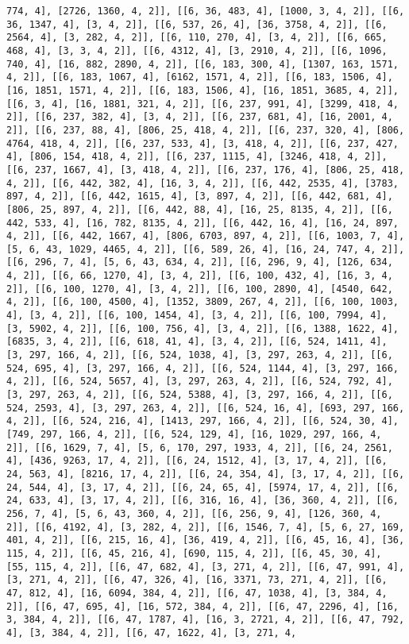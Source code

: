 \documentclass[12pt,fleqn]{article}\usepackage{../../common}
\begin{document}
\begin{verbatim}
774, 4], [2726, 1360, 4, 2]], [[6, 36, 483, 4], [1000, 3, 4, 2]], [[6, 36, 1347, 4], [3, 4, 2]], [[6, 537, 26, 4], [36, 3758, 4, 2]], [[6, 2564, 4], [3, 282, 4, 2]], [[6, 110, 270, 4], [3, 4, 2]], [[6, 665, 468, 4], [3, 3, 4, 2]], [[6, 4312, 4], [3, 2910, 4, 2]], [[6, 1096, 740, 4], [16, 882, 2890, 4, 2]], [[6, 183, 300, 4], [1307, 163, 1571, 4, 2]], [[6, 183, 1067, 4], [6162, 1571, 4, 2]], [[6, 183, 1506, 4], [16, 1851, 1571, 4, 2]], [[6, 183, 1506, 4], [16, 1851, 3685, 4, 2]], [[6, 3, 4], [16, 1881, 321, 4, 2]], [[6, 237, 991, 4], [3299, 418, 4, 2]], [[6, 237, 382, 4], [3, 4, 2]], [[6, 237, 681, 4], [16, 2001, 4, 2]], [[6, 237, 88, 4], [806, 25, 418, 4, 2]], [[6, 237, 320, 4], [806, 4764, 418, 4, 2]], [[6, 237, 533, 4], [3, 418, 4, 2]], [[6, 237, 427, 4], [806, 154, 418, 4, 2]], [[6, 237, 1115, 4], [3246, 418, 4, 2]], [[6, 237, 1667, 4], [3, 418, 4, 2]], [[6, 237, 176, 4], [806, 25, 418, 4, 2]], [[6, 442, 382, 4], [16, 3, 4, 2]], [[6, 442, 2535, 4], [3783, 897, 4, 2]], [[6, 442, 1615, 4], [3, 897, 4, 2]], [[6, 442, 681, 4], [806, 25, 897, 4, 2]], [[6, 442, 88, 4], [16, 25, 8135, 4, 2]], [[6, 442, 533, 4], [16, 782, 8135, 4, 2]], [[6, 442, 16, 4], [16, 24, 897, 4, 2]], [[6, 442, 1667, 4], [806, 6703, 897, 4, 2]], [[6, 1003, 7, 4], [5, 6, 43, 1029, 4465, 4, 2]], [[6, 589, 26, 4], [16, 24, 747, 4, 2]], [[6, 296, 7, 4], [5, 6, 43, 634, 4, 2]], [[6, 296, 9, 4], [126, 634, 4, 2]], [[6, 66, 1270, 4], [3, 4, 2]], [[6, 100, 432, 4], [16, 3, 4, 2]], [[6, 100, 1270, 4], [3, 4, 2]], [[6, 100, 2890, 4], [4540, 642, 4, 2]], [[6, 100, 4500, 4], [1352, 3809, 267, 4, 2]], [[6, 100, 1003, 4], [3, 4, 2]], [[6, 100, 1454, 4], [3, 4, 2]], [[6, 100, 7994, 4], [3, 5902, 4, 2]], [[6, 100, 756, 4], [3, 4, 2]], [[6, 1388, 1622, 4], [6835, 3, 4, 2]], [[6, 618, 41, 4], [3, 4, 2]], [[6, 524, 1411, 4], [3, 297, 166, 4, 2]], [[6, 524, 1038, 4], [3, 297, 263, 4, 2]], [[6, 524, 695, 4], [3, 297, 166, 4, 2]], [[6, 524, 1144, 4], [3, 297, 166, 4, 2]], [[6, 524, 5657, 4], [3, 297, 263, 4, 2]], [[6, 524, 792, 4], [3, 297, 263, 4, 2]], [[6, 524, 5388, 4], [3, 297, 166, 4, 2]], [[6, 524, 2593, 4], [3, 297, 263, 4, 2]], [[6, 524, 16, 4], [693, 297, 166, 4, 2]], [[6, 524, 216, 4], [1413, 297, 166, 4, 2]], [[6, 524, 30, 4], [749, 297, 166, 4, 2]], [[6, 524, 129, 4], [16, 1029, 297, 166, 4, 2]], [[6, 1629, 7, 4], [5, 6, 170, 297, 1933, 4, 2]], [[6, 24, 2561, 4], [436, 9263, 17, 4, 2]], [[6, 24, 1512, 4], [3, 17, 4, 2]], [[6, 24, 563, 4], [8216, 17, 4, 2]], [[6, 24, 354, 4], [3, 17, 4, 2]], [[6, 24, 544, 4], [3, 17, 4, 2]], [[6, 24, 65, 4], [5974, 17, 4, 2]], [[6, 24, 633, 4], [3, 17, 4, 2]], [[6, 316, 16, 4], [36, 360, 4, 2]], [[6, 256, 7, 4], [5, 6, 43, 360, 4, 2]], [[6, 256, 9, 4], [126, 360, 4, 2]], [[6, 4192, 4], [3, 282, 4, 2]], [[6, 1546, 7, 4], [5, 6, 27, 169, 401, 4, 2]], [[6, 215, 16, 4], [36, 419, 4, 2]], [[6, 45, 16, 4], [36, 115, 4, 2]], [[6, 45, 216, 4], [690, 115, 4, 2]], [[6, 45, 30, 4], [55, 115, 4, 2]], [[6, 47, 682, 4], [3, 271, 4, 2]], [[6, 47, 991, 4], [3, 271, 4, 2]], [[6, 47, 326, 4], [16, 3371, 73, 271, 4, 2]], [[6, 47, 812, 4], [16, 6094, 384, 4, 2]], [[6, 47, 1038, 4], [3, 384, 4, 2]], [[6, 47, 695, 4], [16, 572, 384, 4, 2]], [[6, 47, 2296, 4], [16, 3, 384, 4, 2]], [[6, 47, 1787, 4], [16, 3, 2721, 4, 2]], [[6, 47, 792, 4], [3, 384, 4, 2]], [[6, 47, 1622, 4], [3, 271, 4, 
\end{verbatim}
\end{document}
